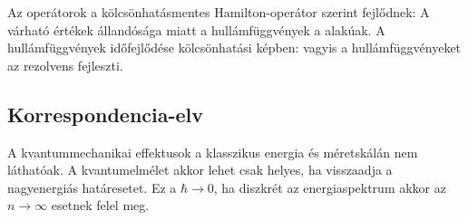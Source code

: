     Az operátorok a kölcsönhatásmentes Hamilton-operátor szerint fejlődnek:
    A várható értékek állandósága miatt a hullámfüggvények a
    alakúak.
   A hullámfüggvények időfejlődése kölcsönhatási képben:
    vagyis a hullámfüggvényeket az 
    rezolvens fejleszti. 
   
  \subsection{Korrespondencia-elv}
   
   A kvantummechanikai effektusok a klasszikus energia és méretskálán nem láthatóak.
   A kvantumelmélet akkor lehet csak helyes, ha visszaadja a nagyenergiás határesetet.
   Ez a $\hbar\to 0$, ha diszkrét az energiaspektrum akkor az $n\to \infty$ esetnek felel meg. 
